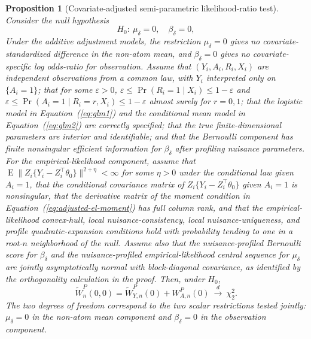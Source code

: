 \documentclass[11pt]{article}
\DeclareMathOperator*{\E}{E}
\newtheorem{proposition}{Proposition}
\begin{document}
\begin{proposition}[Covariate-adjusted semi-parametric likelihood-ratio test]\label{prop:covariate-adjusted-splrt}
Consider the null hypothesis
\[
  H_0:\ \mu_\delta = 0,\quad \beta_\delta = 0,
\]
Under the additive adjustment models, the restriction $\mu_\delta=0$ gives no covariate-standardized difference in the non-atom mean, and $\beta_\delta=0$ gives no covariate-specific log odds-ratio for observation. Assume that $(Y_i,A_i,R_i,X_i)$ are independent observations from a common law, with $Y_i$ interpreted only on $\{A_i=1\}$; that for some $\varepsilon>0$, $\varepsilon \leq \Pr(R_i=1\mid X_i) \leq 1-\varepsilon$ and $\varepsilon \leq \Pr(A_i=1\mid R_i=r,X_i) \leq 1-\varepsilon$ almost surely for $r=0,1$; that the logistic model in Equation~(\ref{eq:glm1}) and the conditional mean model in Equation~(\ref{eq:glm2}) are correctly specified; that the true finite-dimensional parameters are interior and identifiable; and that the Bernoulli component has finite nonsingular efficient information for $\beta_\delta$ after profiling nuisance parameters. For the empirical-likelihood component, assume that $\E\|Z_i\{Y_i-Z_i^\top\theta_0\}\|^{2+\eta}<\infty$ for some $\eta>0$ under the conditional law given $A_i=1$, that the conditional covariance matrix of $Z_i\{Y_i-Z_i^\top\theta_0\}$ given $A_i=1$ is nonsingular, that the derivative matrix of the moment condition in Equation~(\ref{eq:adjusted-el-moment}) has full column rank, and that the empirical-likelihood convex-hull, local nuisance-consistency, local nuisance-uniqueness, and profile quadratic-expansion conditions hold with probability tending to one in a root-$n$ neighborhood of the null. Assume also that the nuisance-profiled Bernoulli score for $\beta_\delta$ and the nuisance-profiled empirical-likelihood central sequence for $\mu_\delta$ are jointly asymptotically normal with block-diagonal covariance, as identified by the orthogonality calculation in the proof. Then, under $H_0$,
\[
  \widetilde{W}_n^P(0,0)
  =
  \widetilde{W}_{Y,n}^P(0)+W_{A,n}^P(0)
  \ \overset{d}{\longrightarrow}\ \chi^2_2.
\]
The two degrees of freedom correspond to the two scalar restrictions tested jointly: $\mu_\delta=0$ in the non-atom mean component and $\beta_\delta=0$ in the observation component.
\end{proposition}
\end{document}
